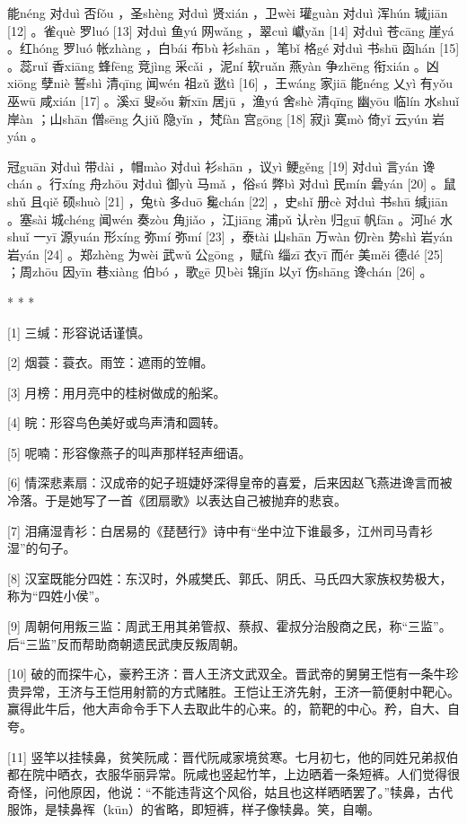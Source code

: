 \documentclass[12pt,UTF8]{ctexbook}
\begin{document}
能néng 对duì 否fǒu ，圣shèng 对duì 贤xián ，卫wèi 瓘guàn 对duì 浑hún 瑊jiān [12] 。雀què 罗luó [13] 对duì 鱼yú 网wǎng ，翠cuì 巘yǎn [14] 对duì 苍cāng 崖yá 。红hóng 罗luó 帐zhàng ，白bái 布bù 衫shān ，笔bǐ 格gé 对duì 书shū 函hán [15] 。蕊ruǐ 香xiāng 蜂fēng 竞jìng 采cǎi ，泥ní 软ruǎn 燕yàn 争zhēng 衔xián 。凶xiōng 孽niè 誓shì 清qīng 闻wén 祖zǔ 逖tì [16] ，王wáng 家jiā 能néng 乂yì 有yǒu 巫wū 咸xián [17] 。溪xī 叟sǒu 新xīn 居jū ，渔yú 舍shè 清qīng 幽yōu 临lín 水shuǐ 岸àn ；山shān 僧sēng 久jiǔ 隐yǐn ，梵fàn 宫gōng [18] 寂jì 寞mò 倚yǐ 云yún 岩yán 。

冠guān 对duì 带dài ，帽mào 对duì 衫shān ，议yì 鲠gěng [19] 对duì 言yán 谗chán 。行xíng 舟zhōu 对duì 御yù 马mǎ ，俗sú 弊bì 对duì 民mín 碞yán [20] 。鼠shǔ 且qiě 硕shuò [21] ，兔tù 多duō 毚chán [22] ，史shǐ 册cè 对duì 书shū 缄jiān 。塞sài 城chéng 闻wén 奏zòu 角jiǎo ，江jiāng 浦pǔ 认rèn 归guī 帆fān 。河hé 水shuǐ 一yī 源yuán 形xíng 弥mí 弥mí [23] ，泰tài 山shān 万wàn 仞rèn 势shì 岩yán 岩yán [24] 。郑zhèng 为wèi 武wǔ 公gōng ，赋fù 缁zī 衣yī 而ér 美měi 德dé [25] ；周zhōu 因yīn 巷xiàng 伯bó ，歌gē 贝bèi 锦jǐn 以yǐ 伤shāng 谗chán [26] 。



* * *



[1] 三缄：形容说话谨慎。

[2] 烟蓑：蓑衣。雨笠：遮雨的笠帽。

[3] 月榜：用月亮中的桂树做成的船桨。

[4] 睆：形容鸟色美好或鸟声清和圆转。

[5] 呢喃：形容像燕子的叫声那样轻声细语。

[6] 情深悲素扇：汉成帝的妃子班婕妤深得皇帝的喜爱，后来因赵飞燕进谗言而被冷落。于是她写了一首《团扇歌》以表达自己被抛弃的悲哀。

[7] 泪痛湿青衫：白居易的《琵琶行》诗中有“坐中泣下谁最多，江州司马青衫湿”的句子。

[8] 汉室既能分四姓：东汉时，外戚樊氏、郭氏、阴氏、马氏四大家族权势极大，称为“四姓小侯”。

[9] 周朝何用叛三监：周武王用其弟管叔、蔡叔、霍叔分治殷商之民，称“三监”。后“三监”反而帮助商朝遗民武庚反叛周朝。

[10] 破的而探牛心，豪矜王济：晋人王济文武双全。晋武帝的舅舅王恺有一条牛珍贵异常，王济与王恺用射箭的方式赌胜。王恺让王济先射，王济一箭便射中靶心。赢得此牛后，他大声命令手下人去取此牛的心来。的，箭靶的中心。矜，自大、自夸。

[11] 竖竿以挂犊鼻，贫笑阮咸：晋代阮咸家境贫寒。七月初七，他的同姓兄弟叔伯都在院中晒衣，衣服华丽异常。阮咸也竖起竹竿，上边晒着一条短裤。人们觉得很奇怪，问他原因，他说：“不能违背这个风俗，姑且也这样晒晒罢了。”犊鼻，古代服饰，是犊鼻裈（kūn）的省略，即短裤，样子像犊鼻。笑，自嘲。
\end{document}
